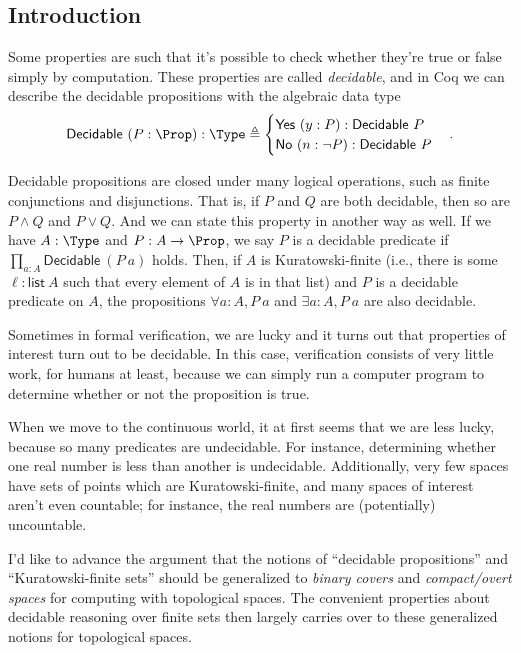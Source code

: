 \subsection{Introduction}

Some properties are such that it's possible to check whether they're true or false simply by computation. These properties are called \emph{decidable}, and in Coq we can describe the decidable propositions with the algebraic data type
\[
\mathsf{Decidable}\ (P : \Prop) : \Type \triangleq
  \begin{cases}
  \mathsf{Yes}\ (y : P) : \mathsf{Decidable}\ P
  \\ \mathsf{No}\ (n : \neg P) : \mathsf{Decidable}\ P
  \end{cases}.
\]

Decidable propositions are closed under many logical operations, such as finite conjunctions and disjunctions. That is, if $P$ and $Q$ are both decidable, then so are $P \wedge Q$ and $P \vee Q$. And we can state this property in another way as well. If we have $A : \Type$ and $P : A \to \Prop$, we say $P$ is a decidable predicate if $\prod_{a : A} \mathsf{Decidable}\ (P\ a)$ holds. Then, if $A$ is Kuratowski-finite (i.e., there is some $\ell : \mathsf{list}\ A$ such that every element of $A$ is in that list) and $P$ is a decidable predicate on $A$, the propositions $\forall a : A, P\ a$ and $\exists a : A, P\ a$ are also decidable.

Sometimes in formal verification, we are lucky and it turns out that properties of interest turn out to be decidable. In this case, verification consists of very little work, for humans at least, because we can simply run a computer program to determine whether or not the proposition is true.

When we move to the continuous world, it at first seems that we are less lucky, because so many predicates are undecidable. For instance, determining whether one real number is less than another is undecidable. Additionally, very few spaces have sets of points which are Kuratowski-finite, and many spaces of interest aren't even countable; for instance, the real numbers are (potentially) uncountable.

I'd like to advance the argument that the notions of ``decidable propositions'' and ``Kuratowski-finite sets'' should be generalized to \emph{binary covers} and \emph{compact/overt spaces} for computing with topological spaces. The convenient properties about decidable reasoning over finite sets then largely carries over to these generalized notions for topological spaces.

